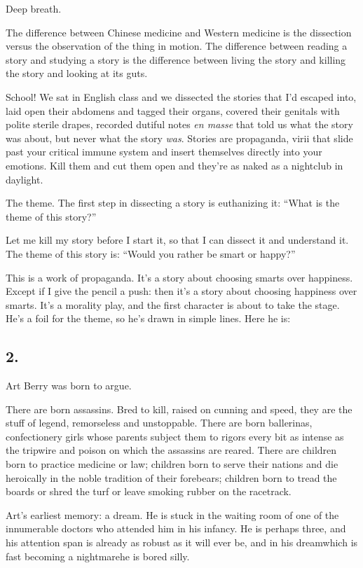 Deep breath.

The difference between Chinese medicine and Western medicine is the
dissection versus the observation of the thing in motion. The
difference between reading a story and studying a story is the
difference between living the story and killing the story and
looking at its guts.

School! We sat in English class and we dissected the stories that
I’d escaped into, laid open their abdomens and tagged their organs,
covered their genitals with polite sterile drapes, recorded dutiful
notes \emph{en masse} that told us what the story was about, but
never what the story \emph{was}. Stories are propaganda, virii that
slide past your critical immune system and insert themselves
directly into your emotions. Kill them and cut them open and
they’re as naked as a nightclub in daylight.

The theme. The first step in dissecting a story is euthanizing it:
“What is the theme of this story?”

Let me kill my story before I start it, so that I can dissect it
and understand it. The theme of this story is: “Would you rather be
smart or happy?”

This is a work of propaganda. It’s a story about choosing smarts
over happiness. Except if I give the pencil a push: then it’s a
story about choosing happiness over smarts. It’s a morality play,
and the first character is about to take the stage. He’s a foil for
the theme, so he’s drawn in simple lines. Here he is:

\subsection{2.}

Art Berry was born to argue.

There are born assassins. Bred to kill, raised on cunning and
speed, they are the stuff of legend, remorseless and unstoppable.
There are born ballerinas, confectionery girls whose parents
subject them to rigors every bit as intense as the tripwire and
poison on which the assassins are reared. There are children born
to practice medicine or law; children born to serve their nations
and die heroically in the noble tradition of their forebears;
children born to tread the boards or shred the turf or leave
smoking rubber on the racetrack.

Art’s earliest memory: a dream. He is stuck in the waiting room of
one of the innumerable doctors who attended him in his infancy. He
is perhaps three, and his attention span is already as robust as it
will ever be, and in his dream{\dash}which is fast becoming a
nightmare{\dash}he is bored silly.

